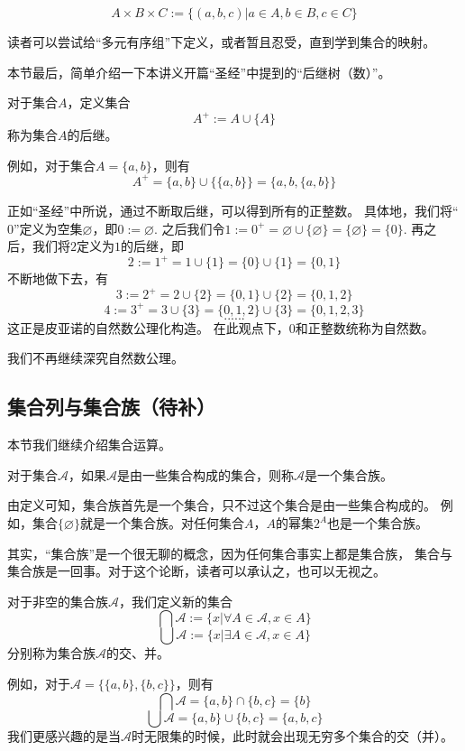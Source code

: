 $$A\times B\times C:=\{(a,b,c)|a\in A,b\in B, c\in C\}$$

读者可以尝试给“多元有序组”下定义，或者暂且忍受，直到学到集合的映射。\vs

本节最后，简单介绍一下本讲义开篇“圣经”中提到的“后继树（数）”。
\begin{definition}[后继]
对于集合$A$，定义集合
$$A^+:=A\cup\{A\}$$
称为集合$A$的后继。
\end{definition}

例如，对于集合$A=\{a,b\}$，则有
$$A^+=\{a,b\}\cup\{\{a,b\}\}=\{a,b,\{a,b\}\}$$

正如“圣经”中所说，通过不断取后继，可以得到所有的正整数。
具体地，我们将“$0$”定义为空集$\varnothing$，即$0:=\varnothing$.
之后我们令$1:=0^+=\varnothing\cup\{\varnothing\}=\{\varnothing\}=\{0\}$.
再之后，我们将$2$定义为$1$的后继，即
$$2:=1^+=1\cup\{1\}=\{0\}\cup\{1\}=\{0,1\}$$
不断地做下去，有
$$3:=2^+=2\cup\{2\}=\{0,1\}\cup\{2\}=\{0,1,2\}$$
$$4:=3^+=3\cup\{3\}=\{0,1,2\}\cup\{3\}=\{0,1,2,3\}$$
$$......$$
这正是皮亚诺的自然数公理化构造。
在此观点下，0和正整数统称为自然数。

我们不再继续深究自然数公理。

\subsection{集合列与集合族（待补）}
本节我们继续介绍集合运算。
\begin{definition}[集合族]
对于集合$\mathcal{A}$，如果$\mathcal{A}$是由一些集合构成的集合，则称$\mathcal{A}$是一个集合族。
\end{definition}
由定义可知，集合族首先是一个集合，只不过这个集合是由一些集合构成的。
例如，集合$\{\varnothing\}$就是一个集合族。对任何集合$A$，$A$的幂集$2^A$也是一个集合族。

其实，“集合族”是一个很无聊的概念，因为任何集合事实上都是集合族，
集合与集合族是一回事。对于这个论断，读者可以承认之，也可以无视之。

\begin{definition}[任意交与任意并]
对于非空的集合族$\mathcal{A}$，我们定义新的集合
$$\bigcap \mathcal{A}:=\{x|\forall A\in \mathcal{A},x\in A\}$$
$$\bigcup \mathcal{A}:=\{x|\exists A\in \mathcal{A},x\in A\}$$
分别称为集合族$\mathcal{A}$的交、并。
\end{definition}
例如，对于$\mathcal{A}=\{\{a,b\},\{b,c\}\}$，则有
$$\bigcap \mathcal{A}=\{a,b\}\cap\{b,c\}=\{b\}$$
$$\bigcup \mathcal{A}=\{a,b\}\cup\{b,c\}=\{a,b,c\}$$
我们更感兴趣的是当$\mathcal{A}$时无限集的时候，此时就会出现无穷多个集合的交（并）。\vs

